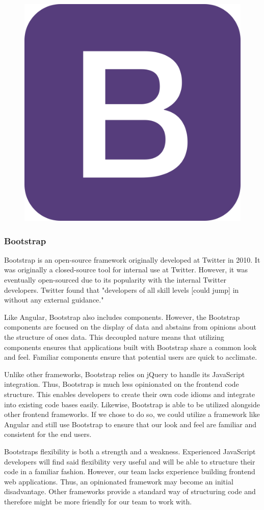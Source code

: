 \documentclass[12pt]{article}
\begin{document}
\begin{figure}[h]
	\centering
	\includegraphics[width=0.25\linewidth]{bootstrap}
\end{figure}

\subsubsection{Bootstrap}

Bootstrap is an open-source framework originally developed at Twitter in 2010.\cite{bootstrapabout} It was originally a closed-source tool for internal use at Twitter. However, it was eventually open-sourced due to its popularity with the internal Twitter developers. Twitter found that "developers of all skill levels [could jump] in without any external guidance."\cite{bootstrapabout}

Like Angular, Bootstrap also includes components. However, the Bootstrap components are focused on the display of data and abstains from opinions about the structure of ones data. This decoupled nature means that utilizing components ensures that applications built with Bootstrap share a common look and feel. Familiar components ensure that potential users are quick to acclimate.

Unlike other frameworks, Bootstrap relies on jQuery to handle its JavaScript integration.\cite{bootstrapjs} Thus, Bootstrap is much less opinionated on the frontend code structure. This enables developers to create their own code idioms and integrate into existing code bases easily. Likewise, Bootstrap is able to be utilized alongside other frontend frameworks. If we chose to do so, we could utilize a framework like Angular and still use Bootstrap to ensure that our look and feel are familiar and consistent for the end users.

Bootstraps flexibility is both a strength and a weakness. Experienced JavaScript developers will find said flexibility very useful and will be able to structure their code in a familiar fashion. However, our team lacks experience building frontend web applications. Thus, an opinionated framework may become an initial disadvantage. Other frameworks provide a standard way of structuring code and therefore might be more friendly for our team to work with.
\end{document}
